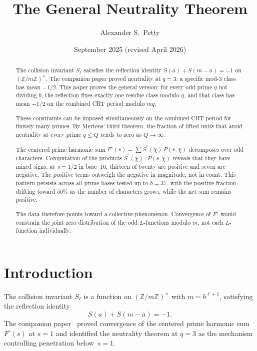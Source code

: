 \documentclass[12pt]{amsart}
\title{The General Neutrality Theorem}
\author{Alexander S.\ Petty}
\date{September 2025 (revised April 2026)}
\theoremstyle{definition}
\theoremstyle{remark}
\begin{document}
\begin{abstract}
The collision invariant $S_{\ell}$ satisfies the
reflection identity $S(a) + S(m{-}a) = -1$ on
$(\mathbb{Z}/m\mathbb{Z})^{\times}$. The companion
paper proved neutrality at $q = 3$: a specific
mod-$3$ class has mean $-1/2$. This paper proves the
general version: for every odd prime $q$ not dividing
$b$, the reflection fixes exactly one residue class
modulo $q$, and that class has mean $-1/2$ on the
combined CRT period modulo $mq$.

These constraints can be imposed simultaneously on the
combined CRT period for finitely many primes. By
Mertens' third theorem, the fraction of lifted units
that avoid neutrality at every prime $q \le Q$ tends
to zero as $Q \to \infty$.

The centered prime harmonic sum
$F^{\circ}(s) = \sum \hat{S}^{\circ}(\chi)\, P(s, \chi)$
decomposes over odd characters. Computation of the
products $\hat{S}^{\circ}(\chi) \cdot P(s, \chi)$
reveals that they have mixed signs: at $s = 1/2$ in
base~$10$, thirteen of twenty are positive and seven
are negative. The positive terms outweigh the negative
in magnitude, not in count. This pattern persists
across all prime bases tested up to $b = 37$, with the
positive fraction drifting toward $50\%$ as the number
of characters grows, while the net sum remains positive.

The data therefore points toward a collective
phenomenon. Convergence of $F^{\circ}$ would constrain
the joint zero distribution
of the odd $L$-functions modulo $m$, not each
$L$-function individually.
\end{abstract}
\maketitle

\section{Introduction}

The collision invariant $S_{\ell}$ is a function on
$(\mathbb{Z}/m\mathbb{Z})^{\times}$ with
$m = b^{\ell+1}$, satisfying the reflection
identity~\cite{paperA}
\[
S(a) + S(m{-}a) = -1.
\]
The companion paper~\cite{paperB} proved convergence of
the centered prime harmonic sum $F^{\circ}(s)$ at
$s = 1$ and identified the neutrality theorem at
$q = 3$ as the mechanism controlling penetration
below~$s = 1$.
\end{document}
